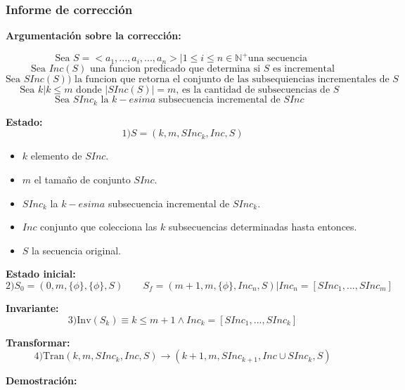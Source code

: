 \documentclass[12pt, a4paper]{article}
\begin{document}
\subsubsection{Informe de corrección}
\textbf{Argumentación sobre la corrección: \\}

\[ \text{Sea } S =<a_1,...,a_i,...,a_n> | 1 \leq i \leq n  \in \mathbb{N}^{+} \text{una secuencia } \]
\[ \text{Sea } Inc(S) \text{ una funcion predicado que determina si $S$ es incremental}  \]
\[ \text{Sea } SInc(S)) \text{ la funcion que retorna el conjunto de las subsequiencias incrementales de $S$}  \]
\[ \text{Sea }k| k \leq m \text{ donde $|SInc(S)| =m$, es la cantidad de subsecuencias de $S$ }\]
\[ \text{Sea }SInc_k \text{ la $k-esima$ subsecuencia incremental de $SInc$ }\]

\textbf{Estado:}
\[ 1) S=(k,m,SInc_k,Inc,S) \]
\begin{itemize}
  \item $k$ elemento de $SInc$.
  \item $m$ el tamaño de conjunto $SInc$.
  \item $SInc_k$ la $k-esima$ subsecuencia incremental de $SInc_k$.
  \item $Inc$ conjunto que colecciona las $k$ subsecuencias determinadas hasta entonces.
  \item $S$ la secuencia original.
\end{itemize}
  
\textbf{Estado inicial:}
\[ 2) S_0 =(0,m,\{\phi\},\{\phi\},S) \qquad S_f=(m+1,m,\{\phi\},Inc_n,S) | Inc_n = [SInc_1,...,SInc_m] \]


\textbf{Invariante:}
\[ 3) \text{Inv}(S_k) \equiv k \leq m+1 \land Inc_k  =[SInc_1,...,SInc_k] \]

\textbf{Transformar:}
\[ 4) \text{Tran}(k,m,SInc_k,Inc,S) \rightarrow (k+1,m,SInc_{k+1},Inc \cup SInc_k,S) \]

\textbf{Demostración:}
\end{document}
